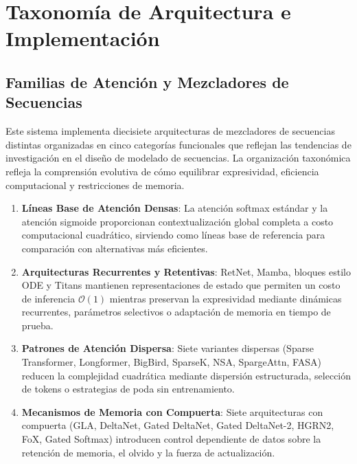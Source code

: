 \section{Taxonomía de Arquitectura e Implementación}
\label{sec:architecture-taxonomy}

\subsection{Familias de Atención y Mezcladores de Secuencias}
\label{sec:attention-families}

Este sistema implementa diecisiete arquitecturas de mezcladores de secuencias distintas organizadas en cinco categorías funcionales que reflejan las tendencias de investigación en el diseño de modelado de secuencias. La organización taxonómica refleja la comprensión evolutiva de cómo equilibrar expresividad, eficiencia computacional y restricciones de memoria.

\begin{enumerate}[leftmargin=*]
    \item \textbf{Líneas Base de Atención Densas}: La atención softmax estándar y la atención sigmoide proporcionan contextualización global completa a costo computacional cuadrático, sirviendo como líneas base de referencia para comparación con alternativas más eficientes.
    \item \textbf{Arquitecturas Recurrentes y Retentivas}: RetNet, Mamba, bloques estilo ODE y Titans mantienen representaciones de estado que permiten un costo de inferencia $\mathcal{O}(1)$ mientras preservan la expresividad mediante dinámicas recurrentes, parámetros selectivos o adaptación de memoria en tiempo de prueba.
    \item \textbf{Patrones de Atención Dispersa}: Siete variantes dispersas (Sparse Transformer, Longformer, BigBird, SparseK, NSA, SpargeAttn, FASA) reducen la complejidad cuadrática mediante dispersión estructurada, selección de tokens o estrategias de poda sin entrenamiento.
    \item \textbf{Mecanismos de Memoria con Compuerta}: Siete arquitecturas con compuerta (GLA, DeltaNet, Gated DeltaNet, Gated DeltaNet-2, HGRN2, FoX, Gated Softmax) introducen control dependiente de datos sobre la retención de memoria, el olvido y la fuerza de actualización.
\end{enumerate}

